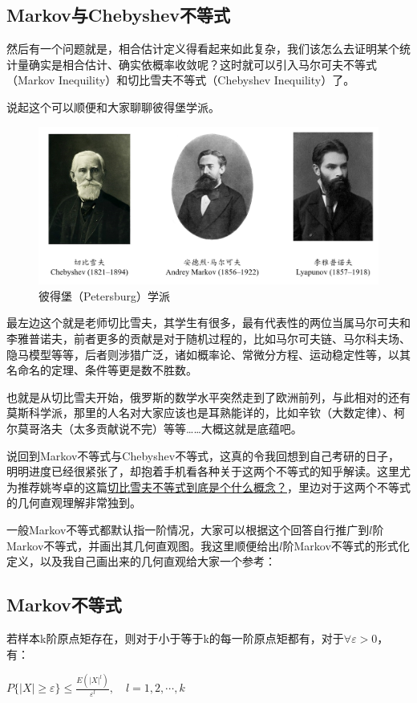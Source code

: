 \documentclass[10pt, a4paper]{article}
\begin{document}
\subsection{Markov与Chebyshev不等式}
然后有一个问题就是，相合估计定义得看起来如此复杂，我们该怎么去证明某个统计量确实是相合估计、确实依概率收敛呢？这时就可以引入马尔可夫不等式（Markov Inequility）和切比雪夫不等式（Chebyshev Inequility）了。\par
说起这个可以顺便和大家聊聊彼得堡学派。
\begin{figure}[H]
    \centering
    \includegraphics[width=\linewidth]{petersburg.png}
    \caption{彼得堡（Petersburg）学派}
    \label{fig:petersburg}
\end{figure}

最左边这个就是老师切比雪夫，其学生有很多，最有代表性的两位当属马尔可夫和李雅普诺夫，前者更多的贡献是对于随机过程的，比如马尔可夫链、马尔科夫场、隐马模型等等，后者则涉猎广泛，诸如概率论、常微分方程、运动稳定性等，以其名命名的定理、条件等更是数不胜数。\par
也就是从切比雪夫开始，俄罗斯的数学水平突然走到了欧洲前列，与此相对的还有莫斯科学派，那里的人名对大家应该也是耳熟能详的，比如辛钦（大数定律）、柯尔莫哥洛夫（太多贡献说不完）等等……大概这就是底蕴吧。\\ \par
说回到Markov不等式与Chebyshev不等式，这真的令我回想到自己考研的日子，明明进度已经很紧张了，却抱着手机看各种关于这两个不等式的知乎解读。这里尤为推荐姚岑卓的这篇\href{https://www.zhihu.com/question/27821324/answer/80814695}{切比雪夫不等式到底是个什么概念？}，里边对于这两个不等式的几何直观理解非常独到。\par
一般Markov不等式都默认指一阶情况，大家可以根据这个回答自行推广到$l$阶Markov不等式，并画出其几何直观图。我这里顺便给出$l$阶Markov不等式的形式化定义，以及我自己画出来的几何直观给大家一个参考：

\subsection*{Markov不等式}
若样本k阶原点矩存在，则对于小于等于k的每一阶原点矩都有，对于$\forall \varepsilon > 0$，有：
\begin{center}
    $P\{|X| \geqslant \varepsilon\} \leqslant \frac{E(|X|^{l} ) }{\varepsilon^{l}}, \quad l=1,2, \cdots, k$
\end{center}
\end{document}
